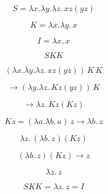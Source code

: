 \documentclass{article}
\begin{document}
\[
S = \lambda x.\lambda y.\lambda z.\, x z (y z)
\]

\[
K = \lambda x.\lambda y.\, x
\]

\[
I = \lambda x.\, x
\]

\[
S K K
\]


\[
(\lambda x.\lambda y.\lambda z.\, x z (y z))\, K\, K
\]

\[
\to (\lambda y.\lambda z.\, K z (y z))\, K
\]

\[
\to \lambda z.\, K z (K z)
\]

\[
K z = (\lambda a.\lambda b.\, a)\, z
\to \lambda b.\, z
\]

\[
\lambda z.\, (\lambda b.\, z)(K z)
\]

\[
(\lambda b.\, z)(K z) \to z
\]

\[
\lambda z.\, z
\]

\[
S K K = \lambda z.\, z = I
\]
\end{document}
